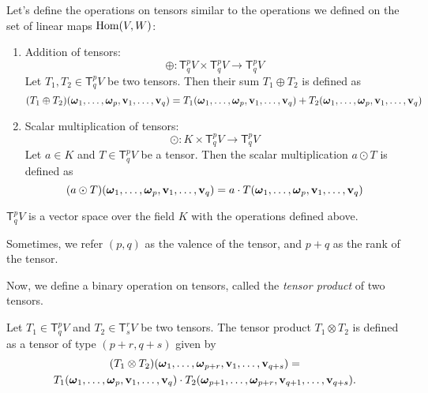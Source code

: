 Let's define the operations on tensors similar to the operations we defined on the set of linear maps \(\operatorname{Hom}(V, W)\):
\begin{enumerate}
    \item \textsf{Addition of tensors}:
          \begin{equation}
              \oplus: \mathsf{T}^p_q V \times \mathsf{T}^p_q V \to \mathsf{T}^p_q V
          \end{equation}
          Let \(T_1, T_2 \in \mathsf{T}^p_q V\) be two tensors. Then their sum \(T_1 \oplus T_2\) is defined as
          \begin{equation}
              (T_1 \oplus T_2)(\vb*{\omega}_1, \ldots, \vb*{\omega}_p, \vb{v}_1, \ldots, \vb{v}_q) = T_1(\vb*{\omega}_1, \ldots, \vb*{\omega}_p, \vb{v}_1, \ldots, \vb{v}_q) + T_2(\vb*{\omega}_1, \ldots, \vb*{\omega}_p, \vb{v}_1, \ldots, \vb{v}_q)
          \end{equation}

    \item \textsf{Scalar multiplication of tensors}:
          \begin{equation}
              \odot: K \times \mathsf{T}^p_q V \to \mathsf{T}^p_q V
          \end{equation}
          Let \(a \in K\) and \(T \in \mathsf{T}^p_q V\) be a tensor. Then the scalar multiplication \(a \odot T\) is defined as
          \begin{equation}
              (a \odot T)(\vb*{\omega}_1, \ldots, \vb*{\omega}_p, \vb{v}_1, \ldots, \vb{v}_q) = a \cdot T(\vb*{\omega}_1, \ldots, \vb*{\omega}_p, \vb{v}_1, \ldots, \vb{v}_q)
          \end{equation}
\end{enumerate}

\begin{proposition}
    \(\mathsf{T}^p_q V\) is a vector space over the field \(K\) with the operations defined above.
\end{proposition}
Sometimes, we refer \((p, q)\) as the valence of the tensor, and \(p + q\) as the rank of the tensor.

Now, we define a binary operation on tensors, called the \emph{tensor product} of two tensors.
\begin{definition}
    Let \(T_1 \in \mathsf{T}^p_q V\) and \(T_2 \in \mathsf{T}^r_s V\) be two tensors. The tensor product \(T_1 \otimes T_2\) is defined as a tensor of type \((p + r, q + s)\) given by
    \begin{multline}
        (T_1 \otimes T_2)(\vb*{\omega}_1, \ldots, \vb*{\omega}_{p + r}, \vb{v}_1, \ldots, \vb{v}_{q + s}) =\\ T_1(\vb*{\omega}_1, \ldots, \vb*{\omega}_p, \vb{v}_1, \ldots, \vb{v}_q) \cdot T_2(\vb*{\omega}_{p + 1}, \ldots, \vb*{\omega}_{p + r}, \vb{v}_{q + 1}, \ldots, \vb{v}_{q + s}).
    \end{multline}
\end{definition}

